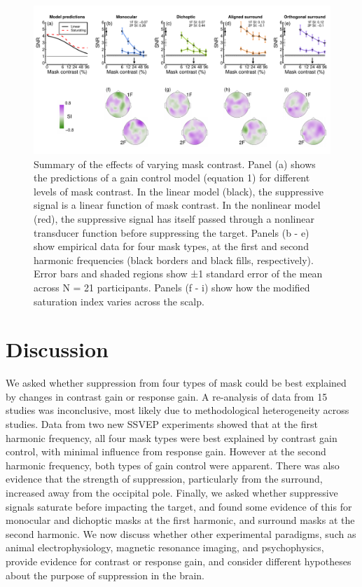 \documentclass[]{article}
\begin{document}
\begin{figure}

{\centering \includegraphics{figures/masksignals} 

}

\caption{Summary of the effects of varying mask contrast. Panel (a) shows the predictions of a gain control model (equation 1) for different levels of mask contrast. In the linear model (black), the suppressive signal is a linear function of mask contrast. In the nonlinear model (red), the suppressive signal has itself passed through a nonlinear transducer function before suppressing the target. Panels (b - e) show empirical data for four mask types, at the first and second harmonic frequencies (black borders and black fills, respectively). Error bars and shaded regions show ±1 standard error of the mean across N = 21 participants. Panels (f - i) show how the modified saturation index varies across the scalp.}\label{fig:masksignals}
\end{figure}

\hypertarget{discussion}{%
\section{Discussion}\label{discussion}}

We asked whether suppression from four types of mask could be best explained by changes in contrast gain or response gain. A re-analysis of data from 15 studies was inconclusive, most likely due to methodological heterogeneity across studies. Data from two new SSVEP experiments showed that at the first harmonic frequency, all four mask types were best explained by contrast gain control, with minimal influence from response gain. However at the second harmonic frequency, both types of gain control were apparent. There was also evidence that the strength of suppression, particularly from the surround, increased away from the occipital pole. Finally, we asked whether suppressive signals saturate before impacting the target, and found some evidence of this for monocular and dichoptic masks at the first harmonic, and surround masks at the second harmonic. We now discuss whether other experimental paradigms, such as animal electrophysiology, magnetic resonance imaging, and psychophysics, provide evidence for contrast or response gain, and consider different hypotheses about the purpose of suppression in the brain.
\end{document}

